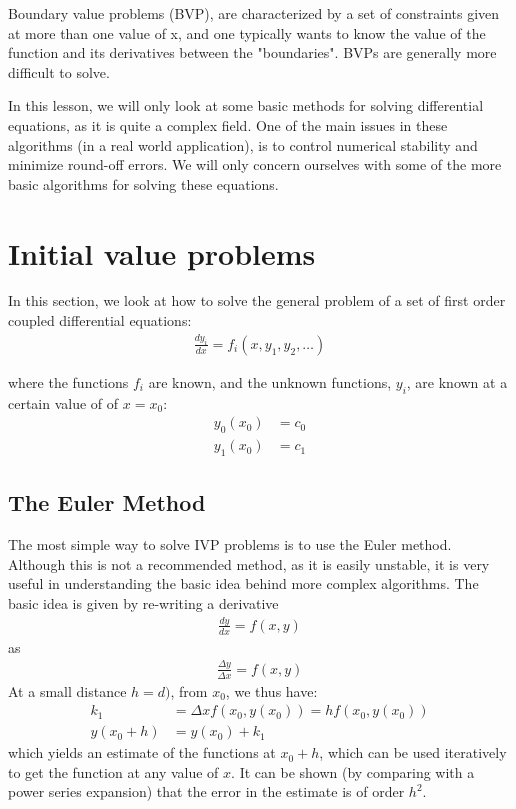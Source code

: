 Boundary value problems (BVP), are characterized by a set of constraints given at more than one value of x, and one typically wants to know the value of the function and its derivatives between the "boundaries". BVPs are generally more difficult to solve. 

In this lesson, we will only look at some basic methods for solving differential equations, as it is quite a complex field. One of the main issues in these algorithms (in a real world application), is to control numerical stability and minimize round-off errors. We will only concern ourselves with some of the more basic algorithms for solving these equations.

\section{Initial value problems}
In this section, we look at how to solve the general problem of a set of first order coupled differential equations:
\begin{align}
\frac{dy_i}{dx} = f_i(x, y_1,y_2,\ldots )
\end{align}

where the functions $f_i$ are known, and the unknown functions, $y_i$, are known at a certain value of of $x=x_0$:
\begin{align}
 y_0(x_0) &= c_0 \nonumber\\
 y_1(x_0) &= c_1
\end{align}
 

\subsection{The Euler Method}

The most simple way to solve IVP problems is to use the Euler method. Although this is not a recommended method, as it is easily unstable, it is very useful in understanding the basic idea behind more complex algorithms. The basic idea is given by re-writing a derivative
\begin{align}
 \frac{dy}{dx} = f(x,y) 
\end{align}
as
\begin{align}
\frac{\Delta y}{\Delta x } = f(x,y)
\end{align}
At a small distance $h=d)$, from $x_0$, we thus have:
\begin{align}
 k_1&=\Delta xf(x_0,y(x_0))=hf(x_0,y(x_0)) \nonumber\\
 y(x_0+h) &= y(x_0) + k_1 
\end{align}
which yields an estimate of the functions at $x_0+h$, which can be used iteratively to get the function at any value of $x$. It can be shown (by comparing with a power series expansion) that the error in the estimate is of order $h^2$.

